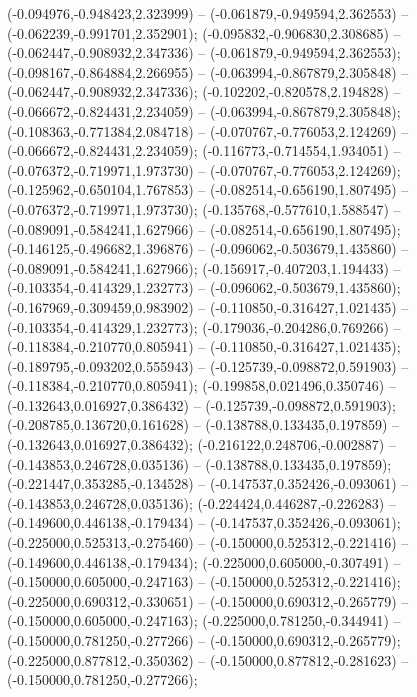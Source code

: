  (-0.094976,-0.948423,2.323999) -- (-0.061879,-0.949594,2.362553) -- (-0.062239,-0.991701,2.352901);
 (-0.095832,-0.906830,2.308685) -- (-0.062447,-0.908932,2.347336) -- (-0.061879,-0.949594,2.362553);
 (-0.098167,-0.864884,2.266955) -- (-0.063994,-0.867879,2.305848) -- (-0.062447,-0.908932,2.347336);
 (-0.102202,-0.820578,2.194828) -- (-0.066672,-0.824431,2.234059) -- (-0.063994,-0.867879,2.305848);
 (-0.108363,-0.771384,2.084718) -- (-0.070767,-0.776053,2.124269) -- (-0.066672,-0.824431,2.234059);
 (-0.116773,-0.714554,1.934051) -- (-0.076372,-0.719971,1.973730) -- (-0.070767,-0.776053,2.124269);
 (-0.125962,-0.650104,1.767853) -- (-0.082514,-0.656190,1.807495) -- (-0.076372,-0.719971,1.973730);
 (-0.135768,-0.577610,1.588547) -- (-0.089091,-0.584241,1.627966) -- (-0.082514,-0.656190,1.807495);
 (-0.146125,-0.496682,1.396876) -- (-0.096062,-0.503679,1.435860) -- (-0.089091,-0.584241,1.627966);
 (-0.156917,-0.407203,1.194433) -- (-0.103354,-0.414329,1.232773) -- (-0.096062,-0.503679,1.435860);
 (-0.167969,-0.309459,0.983902) -- (-0.110850,-0.316427,1.021435) -- (-0.103354,-0.414329,1.232773);
 (-0.179036,-0.204286,0.769266) -- (-0.118384,-0.210770,0.805941) -- (-0.110850,-0.316427,1.021435);
 (-0.189795,-0.093202,0.555943) -- (-0.125739,-0.098872,0.591903) -- (-0.118384,-0.210770,0.805941);
 (-0.199858,0.021496,0.350746) -- (-0.132643,0.016927,0.386432) -- (-0.125739,-0.098872,0.591903);
 (-0.208785,0.136720,0.161628) -- (-0.138788,0.133435,0.197859) -- (-0.132643,0.016927,0.386432);
 (-0.216122,0.248706,-0.002887) -- (-0.143853,0.246728,0.035136) -- (-0.138788,0.133435,0.197859);
 (-0.221447,0.353285,-0.134528) -- (-0.147537,0.352426,-0.093061) -- (-0.143853,0.246728,0.035136);
 (-0.224424,0.446287,-0.226283) -- (-0.149600,0.446138,-0.179434) -- (-0.147537,0.352426,-0.093061);
 (-0.225000,0.525313,-0.275460) -- (-0.150000,0.525312,-0.221416) -- (-0.149600,0.446138,-0.179434);
 (-0.225000,0.605000,-0.307491) -- (-0.150000,0.605000,-0.247163) -- (-0.150000,0.525312,-0.221416);
 (-0.225000,0.690312,-0.330651) -- (-0.150000,0.690312,-0.265779) -- (-0.150000,0.605000,-0.247163);
 (-0.225000,0.781250,-0.344941) -- (-0.150000,0.781250,-0.277266) -- (-0.150000,0.690312,-0.265779);
 (-0.225000,0.877812,-0.350362) -- (-0.150000,0.877812,-0.281623) -- (-0.150000,0.781250,-0.277266);
